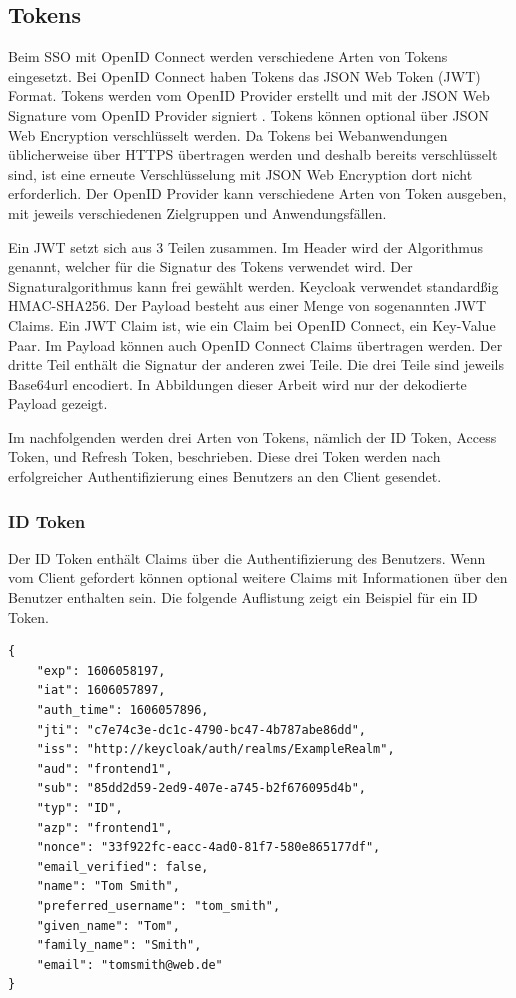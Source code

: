 \subsection{Tokens} \label{EB_Tokens}

Beim SSO mit OpenID Connect werden verschiedene Arten von Tokens eingesetzt. Bei OpenID Connect haben Tokens das JSON Web Token (JWT) Format. Tokens werden vom OpenID Provider erstellt und mit der JSON Web Signature vom OpenID Provider signiert \cite{EB5}. Tokens können optional über JSON Web Encryption verschlüsselt werden. Da Tokens bei Webanwendungen üblicherweise über HTTPS übertragen werden und deshalb bereits verschlüsselt sind, ist eine erneute Verschlüsselung mit JSON Web Encryption dort nicht erforderlich. Der OpenID Provider kann verschiedene Arten von Token ausgeben, mit jeweils verschiedenen Zielgruppen und Anwendungsfällen.

Ein JWT setzt sich aus 3 Teilen zusammen. Im Header wird der Algorithmus genannt, welcher für die Signatur des Tokens verwendet wird. Der Signaturalgorithmus kann frei gewählt werden. Keycloak verwendet standardßig HMAC-SHA256. Der Payload besteht aus einer Menge von sogenannten JWT Claims. Ein JWT Claim ist, wie ein Claim bei OpenID Connect, ein Key-Value Paar. Im Payload können auch OpenID Connect Claims übertragen werden. Der dritte Teil enthält die Signatur der anderen zwei Teile. Die drei Teile sind jeweils Base64url encodiert. In Abbildungen dieser Arbeit wird nur der dekodierte Payload gezeigt.

Im nachfolgenden werden drei Arten von Tokens, nämlich der ID Token, Access Token, und Refresh Token, beschrieben. Diese drei Token werden nach erfolgreicher Authentifizierung eines Benutzers an den Client gesendet.

\subsubsection{ID Token}

Der ID Token enthält Claims über die Authentifizierung des Benutzers. Wenn vom Client gefordert können optional weitere Claims mit Informationen über den Benutzer enthalten sein. Die folgende Auflistung zeigt ein Beispiel für ein ID Token.

\begin{lstlisting}[caption=Beispiel ID Token, captionpos=b]
{
	"exp": 1606058197,
	"iat": 1606057897,
	"auth_time": 1606057896,
	"jti": "c7e74c3e-dc1c-4790-bc47-4b787abe86dd",
	"iss": "http://keycloak/auth/realms/ExampleRealm",
	"aud": "frontend1",
	"sub": "85dd2d59-2ed9-407e-a745-b2f676095d4b",
	"typ": "ID",
	"azp": "frontend1",
	"nonce": "33f922fc-eacc-4ad0-81f7-580e865177df",
	"email_verified": false,
	"name": "Tom Smith",
	"preferred_username": "tom_smith",
	"given_name": "Tom",
	"family_name": "Smith",
	"email": "tomsmith@web.de"
}
\end{lstlisting}

